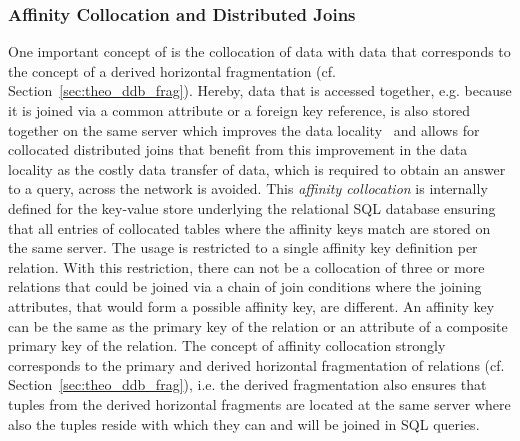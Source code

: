 \subsubsection{Affinity Collocation and Distributed Joins}
\label{sec:meth_ign_affc}

One important concept of  is the collocation of data with data that corresponds to the concept of a derived horizontal fragmentation 
(cf. Section~\ref{sec:theo_ddb_frag}). Hereby, data that is accessed together, e.g. because it is joined via a common attribute or a foreign key reference,
is also stored together on the same server which improves the data locality~\citep{Wiese2014} and allows for collocated distributed joins that benefit from
this improvement in the data locality as the costly data transfer of data, which is required to obtain an answer to a query, across the network is 
avoided. This \emph{affinity collocation} is internally defined for the key-value store underlying the relational SQL database ensuring that all entries 
of collocated tables where the affinity keys match are stored on the same server. The usage is restricted to a single affinity key definition per 
relation. With this restriction, there can not be a collocation of three or more relations that could be joined via a chain of join conditions where the
joining attributes, that would form a possible affinity key, are different. An affinity key can be the same as the primary key of the relation or an 
attribute of a composite primary key of the relation. The concept of affinity collocation strongly corresponds to the primary and derived horizontal
fragmentation of relations (cf. Section~\ref{sec:theo_ddb_frag}), i.e. the derived fragmentation also ensures that tuples from the derived horizontal 
fragments are located at the same server where also the tuples reside with which they can and will be joined in SQL queries.

